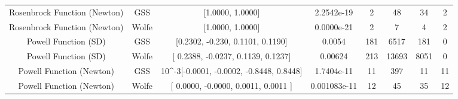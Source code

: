 \documentclass{article}
\begin{document}
\begin{landscape}
\begin{latin}
\begin{table}[h!]
\begin{tabular}{|c|c|c|c|c|c|c|c|}
		 \hline
		 
		Rosenbrock Function (ٔNewton) & GSS    & {[}1.0000, 1.0000{]}                                          & 2.2542e-19 & 2       & 48            & 34             & 2              \\ 
		
		Rosenbrock Function (ٔNewton)  & Wolfe   & {[}1.0000, 1.0000{]}                                          & 0.0000e-21 & 2       & 7            & 4             & 2              \\ 
		
		\hline
		
		Powell Function (SD)  & GSS    & {[}0.2302, -0.230, 0.1101, 0.1190{]}                          & 0.0054     & 181     & 6517          & 181           & 0              \\
		
		Powell Function (SD) & Wolfe      & {[}   0.2388, -0.0237, 0.1139,   0.1237{]}                          & 0.00624    & 213     & 13693          & 8051           & 0              \\	
		 \hline
		
		Powell Function (Newton) & GSS & 10\textasciicircum{}-3{[}-0.0001, -0.0002, -0.8448, 0.8448{]} & 1.7404e-11 & 11      & 397           & 11            & 11             \\ 
		
		Powell Function (Newton) & Wolfe & {[}   0.0000,  -0.0000,  0.0011, 0.0011 {]} & 0.001083e-11 & 12      & 45           & 35            & 12             \\ 
		
		
		\hline
	\end{tabular}
\end{table}
\end{latin}

\end{landscape}
\end{document}
